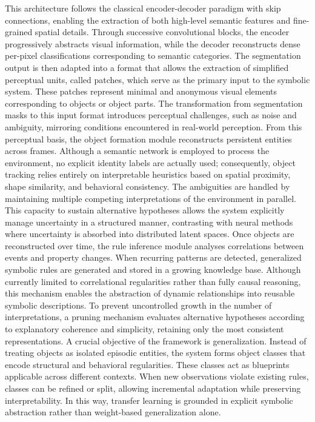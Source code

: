 \documentclass[12pt,a4paper]{report}
\begin{document}
This architecture follows the classical encoder-decoder paradigm with skip connections, enabling the extraction of both high-level semantic features and fine-grained spatial details. Through successive convolutional blocks, the encoder progressively abstracts visual information, while the decoder reconstructs dense per-pixel classifications corresponding to semantic categories. The segmentation output is then adapted into a format that allows the extraction of simplified perceptual units, called patches, which serve as the primary input to the symbolic system. These patches represent minimal and anonymous visual elements corresponding to objects or object parts. 
The transformation from segmentation masks to this input format introduces perceptual challenges, such as noise and ambiguity, mirroring conditions encountered in real-world perception. From this perceptual basis, the object formation module reconstructs persistent entities across frames. 
Although a semantic network is employed to process the environment, no explicit identity labels are actually used; consequently, object tracking relies entirely on interpretable heuristics based on spatial proximity, shape similarity, and behavioral consistency. The ambiguities are handled by maintaining multiple competing interpretations of the environment in parallel. This capacity to sustain alternative hypotheses allows the system explicitly manage uncertainty in a structured manner, contrasting with neural methods where uncertainty is absorbed into distributed latent spaces.
Once objects are reconstructed over time, the rule inference module analyses correlations between events and property changes. When recurring patterns are detected, generalized symbolic rules are generated and stored in a growing knowledge base. Although currently limited to correlational regularities rather than fully causal reasoning, this mechanism enables the abstraction of dynamic relationships into reusable symbolic descriptions. To prevent uncontrolled growth in the number of interpretations, a pruning mechanism evaluates alternative hypotheses according to explanatory coherence and simplicity, retaining only the most consistent representations.
A crucial objective of the framework is generalization. Instead of treating objects as isolated episodic entities, the system forms object classes that encode structural and behavioral regularities. 
These classes act as blueprints applicable across different contexts. When new observations violate existing rules, classes can be refined or split, allowing incremental adaptation while preserving interpretability. In this way, transfer learning is grounded in explicit symbolic abstraction rather than weight-based generalization alone.
\end{document}
